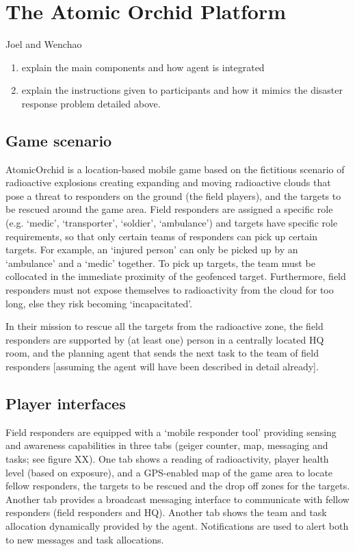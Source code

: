 \documentclass{aamas2014}
\begin{document}


\section{The Atomic Orchid Platform}
Joel and Wenchao
\begin{enumerate}
\item explain the main components  and how agent is integrated
\item explain the instructions given to participants and how it mimics the disaster response problem detailed above.
\end{enumerate}
\subsection{Game scenario}
AtomicOrchid is a location-based mobile game based on the fictitious scenario of radioactive explosions creating expanding and moving radioactive clouds that pose a threat to responders on the ground (the field players), and the targets to be rescued around the game area. Field responders are assigned a specific role (e.g. `medic', `transporter', `soldier', `ambulance') and targets have specific role requirements, so that only certain teams of responders can pick up certain targets. For example, an `injured person' can only be picked up by an `ambulance' and a `medic' together. To pick up targets, the team must be collocated in the immediate proximity of the geofenced target. Furthermore, field responders must not expose themselves to radioactivity from the cloud for too long, else they risk becoming `incapacitated'.

In their mission to rescue all the targets from the radioactive zone, the field responders are supported by (at least one) person in a centrally located HQ room, and the planning agent that sends the next task to the team of field responders [assuming the agent will have been described in detail already].

\subsection{Player interfaces}
Field responders are equipped with a `mobile responder tool' providing sensing and awareness capabilities in three tabs (geiger counter, map, messaging and tasks; see figure XX). One tab shows a reading of radioactivity, player health level (based on exposure), and a GPS-enabled map of the game area to locate fellow responders, the targets to be rescued and the drop off zones for the targets. Another tab provides a broadcast messaging interface to communicate with fellow responders (field responders and HQ). Another tab shows the team and task allocation dynamically provided by the agent. Notifications are used to alert both to new messages and task allocations.
\end{document}
